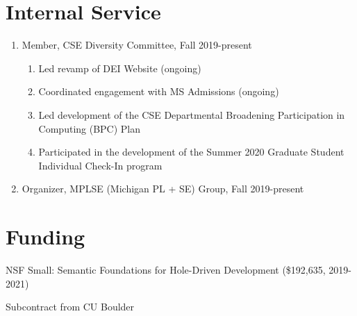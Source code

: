 \documentclass[10pt,letterpaper]{article}
\renewenvironment{itemize}{
  \begin{list}{}{
    \setlength{\leftmargin}{1.25em}
    \setlength{\itemsep}{0.25em}
    \setlength{\parskip}{0pt}
    \setlength{\parsep}{0.2em}
  }
}{
  \end{list}
}
\begin{document}
\section*{Internal Service}
\begin{enumerate}
  \item Member, CSE Diversity Committee, Fall 2019-present
    \begin{enumerate}
      \item Led revamp of DEI Website (ongoing)
      \item Coordinated engagement with MS Admissions (ongoing)
      \item Led development of the CSE Departmental Broadening Participation in Computing (BPC) Plan  
      \item Participated in the development of the Summer 2020 Graduate Student Individual Check-In program
    \end{enumerate}
  \item Organizer, MPLSE (Michigan PL + SE) Group, Fall 2019-present
\end{enumerate}


\section*{Funding}

\begin{itemize}
  \item NSF Small: Semantic Foundations for Hole-Driven Development (\$192,635, 2019-2021)
    \begin{itemize}
      \item Subcontract from CU Boulder
    \end{itemize}
\end{itemize}

\end{document}
